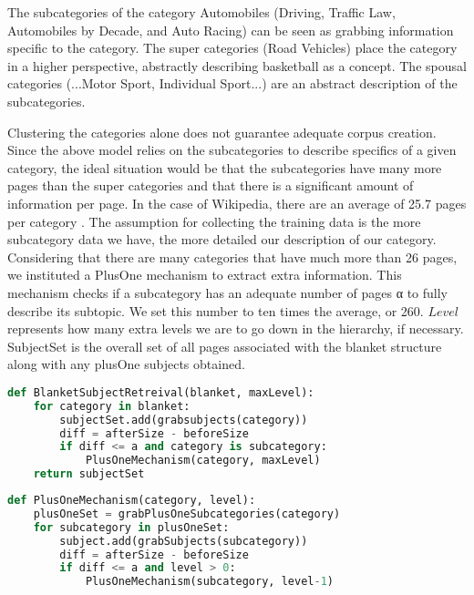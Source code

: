 The subcategories of the category Automobiles (Driving, Traffic Law,
Automobiles by Decade, and Auto Racing) can be seen as grabbing
information specific to the category. The super categories (Road
Vehicles) place the category in a higher perspective, abstractly
describing basketball as a concept. The spousal categories
(...Motor Sport, Individual Sport...) are an abstract description of
the subcategories.


Clustering the categories alone does not guarantee adequate corpus
creation. Since the above model relies on the subcategories to
describe specifics of a given category, the ideal situation would be
that the subcategories have many more pages than the super categories
and that there is a significant amount of information per page.  In
the case of Wikipedia, there are an average of 25.7 pages per category
\cite{1321474}. The assumption for collecting the training data is the
more subcategory data we have, the more detailed our description of
our category. Considering that there are many categories that have
much more than 26 pages, we instituted a PlusOne mechanism to extract
extra information. This mechanism checks if a subcategory has an
adequate number of pages α to fully describe its subtopic. We set this
number to ten times the average, or 260. $Level$ represents how many
extra levels we are to go down in the hierarchy, if
necessary. SubjectSet is the overall set of all pages associated with
the blanket structure along with any plusOne subjects obtained.

\begin{lstlisting}[language=Python, frame=none, tabsize=2, caption=BlanketSubjectRetreival, label=BlanketSubjectRetreival, basicstyle=\small]
def BlanketSubjectRetreival(blanket, maxLevel):
	for category in blanket:
		subjectSet.add(grabsubjects(category))
		diff = afterSize - beforeSize
		if diff <= a and category is subcategory:
			PlusOneMechanism(category, maxLevel)
	return subjectSet
\end{lstlisting}

\begin{lstlisting}[language=Python, frame=none, tabsize=2, caption=PlusOneMechanism, label=PlusOneMechanism, basicstyle=\small]
def PlusOneMechanism(category, level):
	plusOneSet = grabPlusOneSubcategories(category)
	for subcategory in plusOneSet:
		subject.add(grabSubjects(subcategory))
		diff = afterSize - beforeSize
		if diff <= a and level > 0:
			PlusOneMechanism(subcategory, level-1)


\end{lstlisting}


